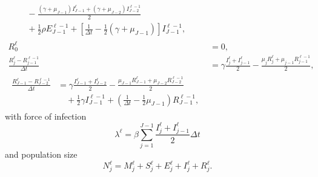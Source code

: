 \documentclass{jpmarticle}
\let\subequationsorig\subequations%
\let\endsubequationsorig\endsubequations%
\renewenvironment{subequations}{
  \subequationsorig
  \renewcommand{\theequation}{\theparentequation.\arabic{equation}}
}{
  \endsubequationsorig
}
\begin{document}
\begin{subequations}
\begin{align}
\begin{split}
      \\ & \quad {}
      - \frac{(\gamma + \mu_{J - 1}) I_{J - 1}^{\ell}
        + (\gamma + \mu_{J - 2}) I_{J - 2}^{\ell - 1}}{2}
      \\ & \quad {}
      + \frac{1}{2} \rho E_{J - 1}^{\ell - 1}
      + \left[\frac{1}{\Delta t}
        - \frac{1}{2} (\gamma + \mu_{J - 1})\right]
      I_{J - 1}^{\ell - 1},
    \end{split}
    \\
    R_0^{\ell} &= 0,
    \\
    \frac{R_j^{\ell} - R_{j - 1}^{\ell - 1}}{\Delta t} &=
    \gamma \frac{I_j^{\ell} + I_{j - 1}^{\ell}}{2}
    - \frac{\mu_j R_j^{\ell} + \mu_{j - 1} R_{j - 1}^{\ell - 1}}{2},
    \\
    \begin{split}
      \frac{R_{J - 1}^{\ell} - R_{J - 2}^{\ell - 1}}{\Delta t} &=
      \gamma \frac{I_{J - 1}^{\ell} + I_{J - 2}^{\ell}}{2}
      - \frac{\mu_{J - 1} R_{J - 1}^{\ell}
        + \mu_{J - 2} R_{J - 2}^{\ell - 1}}{2}
      \\ & \quad {}
      + \frac{1}{2} \gamma I_{J - 1}^{\ell - 1}
      + \left(\frac{1}{\Delta t} - \frac{1}{2} \mu_{J - 1}\right)
      R_{J - 1}^{\ell - 1},
    \end{split}
  \end{align}
  with force of infection
  \begin{equation}
    \lambda^{\ell} =
    \beta \sum_{j = 1}^{J - 1}
    \frac{I_j^{\ell} + I_{j - 1}^{\ell}}{2}
    \Delta t
  \end{equation}
  and population size
  \begin{equation}
    N_j^{\ell} =
    M_j^{\ell} + S_j^{\ell} + E_j^{\ell} + I_j^{\ell} + R_j^{\ell}.
  \end{equation}
\end{subequations}
\end{document}
